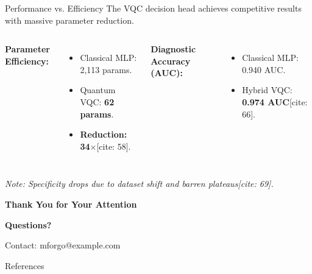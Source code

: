 \documentclass[aspectratio=169, 10pt]{beamer}
\begin{document}
\begin{frame}{Performance vs. Efficiency}
  The VQC decision head achieves competitive results with massive parameter reduction.

  \vspace{0.5cm}
  
  \begin{columns}
      \textbf{Parameter Efficiency:}
      \begin{itemize}
          \item Classical MLP: 2,113 params.
          \item Quantum VQC: \textbf{62 params}.
          \item \textcolor{NTCPurple}{\textbf{Reduction: 34$\times$}}[cite: 58].
      \end{itemize}
      
      \textbf{Diagnostic Accuracy (AUC):}
      \begin{itemize}
          \item Classical MLP: 0.940 AUC.
          \item Hybrid VQC: \textbf{0.974 AUC}[cite: 66].
      \end{itemize}
  \end{columns}
  
  \vspace{0.5cm}
  \centering
  \textit{Note: Specificity drops due to dataset shift and barren plateaus[cite: 69].}
\end{frame}

{
\begin{frame}
  \centering
  \vspace{1cm}
  \huge \textcolor{NTCPurple}{\textbf{Thank You for Your Attention}}
  
  \vspace{1cm}
  \normalsize
  \textbf{Questions?}
  
  \vspace{1.5cm}
  \footnotesize
  \textcolor{NTCGrey}{Contact: mforgo@example.com}
\end{frame}
}

\begin{frame}{References}
  \printbibliography[heading=none]
\end{frame}
\end{document}

